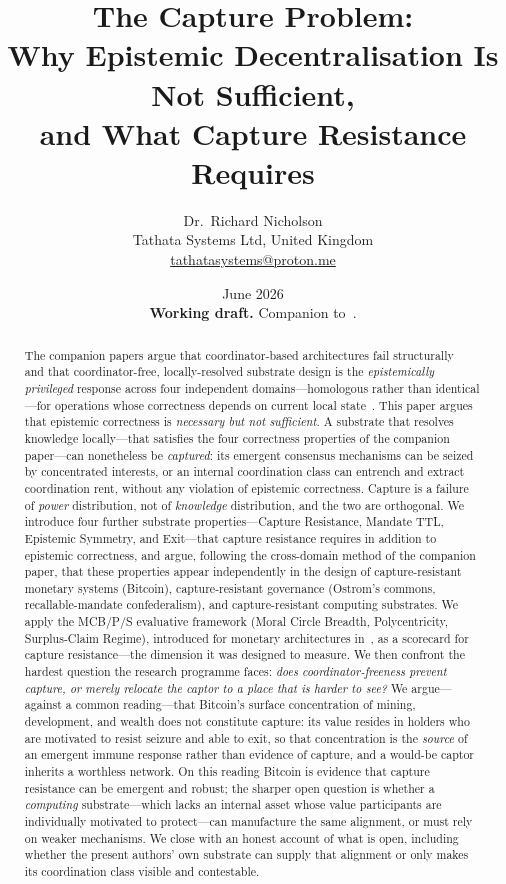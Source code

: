 \documentclass[11pt]{article}
\title{\textbf{The Capture Problem:\\
Why Epistemic Decentralisation Is Not Sufficient,\\
and What Capture Resistance Requires}}
\author{%
  Dr.\ Richard Nicholson\\[4pt]
  \small Tathata Systems Ltd, United Kingdom\\
  \small \href{mailto:tathatasystems@proton.me}{tathatasystems@proton.me}
}
\date{June 2026\\[4pt]
\small \textbf{Working draft.} Companion to~\cite{nicholson2026,nicholson2026hlks}.}
\theoremstyle{definition}
\theoremstyle{plain}
\begin{document}
\maketitle

\begin{abstract}
The companion papers argue that coordinator-based architectures fail
structurally~\cite{nicholson2026} and that coordinator-free, locally-resolved
substrate design is the \emph{epistemically privileged} response across four
independent domains---homologous rather than identical---for operations whose
correctness depends on current local state~\cite{nicholson2026hlks}. This paper argues that epistemic
correctness is \emph{necessary but not sufficient}. A substrate that resolves
knowledge locally---that satisfies the four correctness properties of the
companion paper---can nonetheless be \emph{captured}: its emergent consensus
mechanisms can be seized by concentrated interests, or an internal coordination
class can entrench and extract coordination rent, without any violation of
epistemic correctness. Capture is a failure of \emph{power} distribution, not of
\emph{knowledge} distribution, and the two are orthogonal. We introduce four
further substrate properties---Capture Resistance, Mandate TTL, Epistemic
Symmetry, and Exit---that capture resistance requires in addition to epistemic
correctness, and argue, following the cross-domain method of the
companion paper, that these properties appear independently in the design of
capture-resistant monetary systems (Bitcoin), capture-resistant governance
(Ostrom's commons, recallable-mandate confederalism), and capture-resistant
computing substrates. We apply the MCB/P/S evaluative framework (Moral Circle
Breadth, Polycentricity, Surplus-Claim Regime), introduced for monetary architectures
in~\cite{nicholson2025}, as a scorecard for capture resistance---the dimension it was
designed to measure. We then confront the hardest question the
research programme faces: \emph{does coordinator-freeness prevent capture, or
merely relocate the captor to a place that is harder to see?} We argue---against a
common reading---that Bitcoin's surface concentration of mining, development, and
wealth does not constitute capture: its value resides in holders who are motivated
to resist seizure and able to exit, so that concentration is the \emph{source} of an
emergent immune response rather than evidence of capture, and a would-be captor
inherits a worthless network. On this reading Bitcoin is evidence that capture
resistance can be emergent and robust; the sharper open question is whether a
\emph{computing} substrate---which
lacks an internal asset whose value participants are individually motivated to
protect---can manufacture the same alignment, or must rely on weaker mechanisms. We
close with an honest account of what is open, including whether the present authors'
own substrate can supply that alignment or only makes its coordination class visible
and contestable.
\end{abstract}
\end{document}
